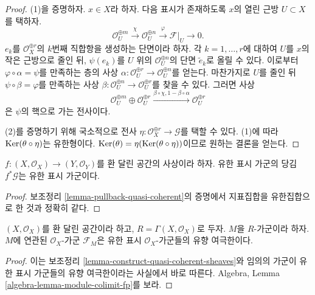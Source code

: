 \begin{proof}
(1)을 증명하자.
$x \in X$라 하자. 다음 표시가 존재하도록 $x$의 열린 근방
$U \subset X$를 택하자.
$$
\mathcal{O}_U^{\oplus m}
\xrightarrow{\chi}
\mathcal{O}_U^{\oplus n}
\xrightarrow{\varphi}
\mathcal{F}|_U
\to
0.
$$
$e_k$를 $\mathcal{O}_X^{\oplus r}$의 $k$번째 직합항을 생성하는 단면이라 하자.
각 $k = 1, \ldots, r$에 대하여 $U$를 $x$의 작은 근방으로 줄인 뒤,
$\psi(e_k)$를 $U$ 위의 $\mathcal{O}_U^{\oplus n}$의 단면
$\tilde e_k$로 올릴 수 있다. 이로부터
$\varphi \circ \alpha = \psi$를 만족하는 층의 사상
$\alpha : \mathcal{O}_U^{\oplus r} \to \mathcal{O}_U^{\oplus n}$를 얻는다.
마찬가지로 $U$를 줄인 뒤 $\psi \circ \beta = \varphi$를 만족하는 사상
$\beta : \mathcal{O}_U^{\oplus n} \to \mathcal{O}_U^{\oplus r}$를 찾을 수 있다.
그러면 사상
$$
\mathcal{O}_U^{\oplus m} \oplus
\mathcal{O}_U^{\oplus r}
\xrightarrow{\beta \circ \chi, 1 - \beta \circ \alpha}
\mathcal{O}_U^{\oplus r}
$$
은 $\psi$의 핵으로 가는 전사이다.

\medskip\noindent
(2)를 증명하기 위해 국소적으로 전사
$\eta : \mathcal{O}_X^{\oplus r} \to \mathcal{G}$를 택할 수 있다.
(1)에 따라 $\mathop{\mathrm{Ker}}(\theta \circ \eta)$는 유한형이다.
$\mathop{\mathrm{Ker}}(\theta) = \eta(\mathop{\mathrm{Ker}}(\theta \circ \eta))$이므로 원하는 결론을 얻는다.
\end{proof}

\begin{lemma}
\label{lemma-pullback-finite-presentation}
$f : (X, \mathcal{O}_X) \to (Y, \mathcal{O}_Y)$를
환 달린 공간의 사상이라 하자.
유한 표시 가군의 당김 $f^*\mathcal{G}$는 유한 표시 가군이다.
\end{lemma}

\begin{proof}
보조정리 \ref{lemma-pullback-quasi-coherent}의 증명에서
지표집합을 유한집합으로 한 것과 정확히 같다.
\end{proof}

\begin{lemma}
\label{lemma-quasi-coherent-limit-finite-presentation}
$(X, \mathcal{O}_X)$를 환 달린 공간이라 하고,
$R = \Gamma(X, \mathcal{O}_X)$로 두자.
$M$을 $R$-가군이라 하자.
$M$에 연관된 $\mathcal{O}_X$-가군 $\mathcal{F}_M$은
유한 표시 $\mathcal{O}_X$-가군들의 유향 여극한이다.
\end{lemma}

\begin{proof}
이는 보조정리 \ref{lemma-construct-quasi-coherent-sheaves}와
임의의 가군이 유한 표시 가군들의 유향 여극한이라는 사실에서 바로 따른다.
Algebra, Lemma \ref{algebra-lemma-module-colimit-fp}를 보라.
\end{proof}

